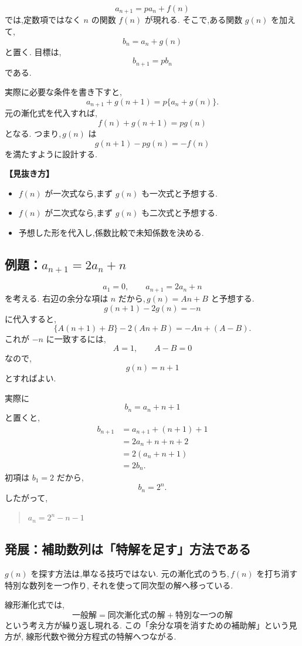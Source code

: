 \[
  a_{n+1}=pa_n+f(n)
\]
では,定数項ではなく $n$ の関数 $f(n)$ が現れる.
そこで,ある関数 $g(n)$ を加えて,
\[
  b_n=a_n+g(n)
\]
と置く.
目標は,
\[
  b_{n+1}=pb_n
\]
である.

実際に必要な条件を書き下すと,
\[
  a_{n+1}+g(n+1)=p\{a_n+g(n)\}.
\]
元の漸化式を代入すれば,
\[
  f(n)+g(n+1)=pg(n)
\]
となる.
つまり,\,$g(n)$ は
\[
  g(n+1)-pg(n)=-f(n)
\]
を満たすように設計する.

\noindent\textbf{【見抜き方】}

\begin{itemize}
  \item $f(n)$ が一次式なら,まず $g(n)$ も一次式と予想する.
  \item $f(n)$ が二次式なら,まず $g(n)$ も二次式と予想する.
  \item 予想した形を代入し,係数比較で未知係数を決める.
\end{itemize}

\subsection{例題：$a_{n+1}=2a_n+n$}

\[
  a_1=0,\qquad a_{n+1}=2a_n+n
\]
を考える.
右辺の余分な項は $n$ だから,\,$g(n)=An+B$ と予想する.
\[
  g(n+1)-2g(n)=-n
\]
に代入すると,
\[
  \{A(n+1)+B\}-2(An+B)
  =-An+(A-B).
\]
これが $-n$ に一致するには,
\[
  A=1,\qquad A-B=0
\]
なので,
\[
  g(n)=n+1
\]
とすればよい.

実際に
\[
  b_n=a_n+n+1
\]
と置くと,
\[
\begin{aligned}
  b_{n+1}
  &=a_{n+1}+(n+1)+1\\
  &=2a_n+n+n+2\\
  &=2(a_n+n+1)\\
  &=2b_n.
\end{aligned}
\]
初項は $b_1=2$ だから,
\[
  b_n=2^n.
\]
したがって,
\begin{quote}
  $a_n=2^n-n-1$
\end{quote}

\subsection{発展：補助数列は「特解を足す」方法である}

$g(n)$ を探す方法は,単なる技巧ではない.
元の漸化式のうち,\,$f(n)$ を打ち消す特別な数列を一つ作り,
それを使って同次型の解へ移っている.

線形漸化式では,
\[
  \text{一般解}
  =
  \text{同次漸化式の解}
  +
  \text{特別な一つの解}
\]
という考え方が繰り返し現れる.
この「余分な項を消すための補助解」という見方が,
線形代数や微分方程式の特解へつながる.

